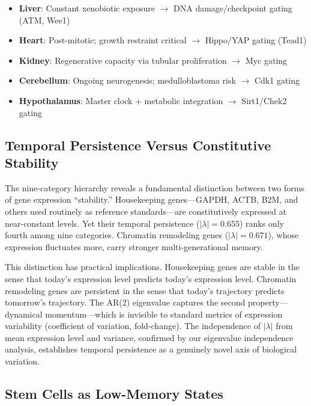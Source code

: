 \documentclass[11pt,letterpaper]{article}
\begin{document}
\begin{itemize}[noitemsep]
    \item \textbf{Liver}: Constant xenobiotic exposure $\rightarrow$ DNA damage/checkpoint gating (ATM, Wee1)
    \item \textbf{Heart}: Post-mitotic; growth restraint critical $\rightarrow$ Hippo/YAP gating (Tead1)
    \item \textbf{Kidney}: Regenerative capacity via tubular proliferation $\rightarrow$ Myc gating
    \item \textbf{Cerebellum}: Ongoing neurogenesis; medulloblastoma risk $\rightarrow$ Cdk1 gating
    \item \textbf{Hypothalamus}: Master clock + metabolic integration $\rightarrow$ Sirt1/Chek2 gating
\end{itemize}

\subsection{Temporal Persistence Versus Constitutive Stability}

The nine-category hierarchy reveals a fundamental distinction between two forms of gene expression ``stability.'' Housekeeping genes---GAPDH, ACTB, B2M, and others used routinely as reference standards---are constitutively expressed at near-constant levels. Yet their temporal persistence ($|\lambda| = 0.655$) ranks only fourth among nine categories. Chromatin remodeling genes ($|\lambda| = 0.671$), whose expression fluctuates more, carry stronger multi-generational memory.

This distinction has practical implications. Housekeeping genes are stable in the sense that today's expression level predicts today's expression level. Chromatin remodeling genes are persistent in the sense that today's trajectory predicts tomorrow's trajectory. The AR(2) eigenvalue captures the second property---dynamical momentum---which is invisible to standard metrics of expression variability (coefficient of variation, fold-change). The independence of $|\lambda|$ from mean expression level and variance, confirmed by our eigenvalue independence analysis, establishes temporal persistence as a genuinely novel axis of biological variation.

\subsection{Stem Cells as Low-Memory States}
\end{document}
